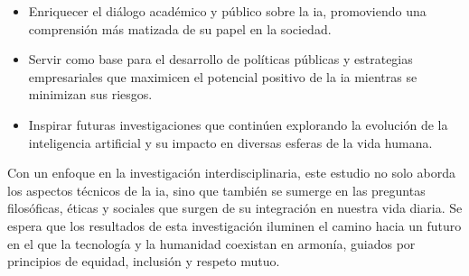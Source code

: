\begin{itemize}
    \item Enriquecer el diálogo académico y público sobre la \acrshort{ia}, promoviendo una comprensión más matizada de su papel en la sociedad.
    \item Servir como base para el desarrollo de políticas públicas y estrategias empresariales que maximicen el potencial positivo de la \acrshort{ia} mientras se minimizan sus riesgos.
    \item Inspirar futuras investigaciones que continúen explorando la evolución de la inteligencia artificial y su impacto en diversas esferas de la vida humana.
\end{itemize}

Con un enfoque en la investigación interdisciplinaria, este estudio no solo aborda los aspectos técnicos de la \acrshort{ia}, sino que también se sumerge en las preguntas filosóficas, éticas y sociales que surgen de su integración en nuestra vida diaria. Se espera que los resultados de esta investigación iluminen el camino hacia un futuro en el que la tecnología y la humanidad coexistan en armonía, guiados por principios de equidad, inclusión y respeto mutuo.
